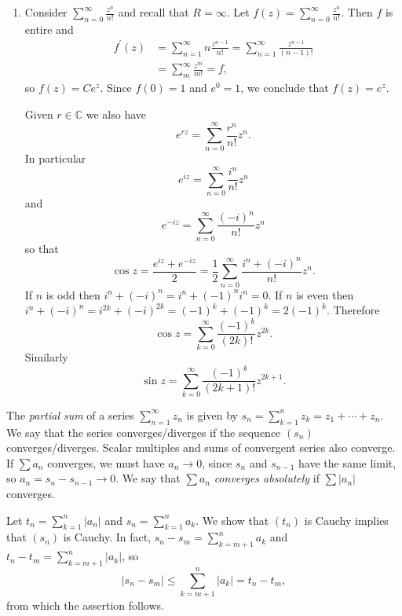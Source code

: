 \begin{xmpl}
  \begin{enumerate}
    \item{
      Consider $\sum_{n=0}^\infty \frac{z^n}{n!}$ and recall that $R = \infty$.
      Let $f(z) = \sum_{n=0}^\infty \frac{z^n}{n!}$. Then $f$ is entire and
      \begin{align*}
         f^\prime(z)
      &= \sum_{n=1}^\infty n \frac{z^{n-1}}{n!}
       = \sum_{n=1}^\infty \frac{z^{n-1}}{(n-1)!} \\
      &= \sum_{m}^\infty \frac{z^m}{m!} = f,
      \end{align*}
      so $f(z) = C e^z$. Since $f(0) = 1$ and $e^0 = 1$,
      we conclude that $f(z) = e^z$.

      Given $r \in \mathbb{C}$ we also have
      $$
      e^{rz} = \sum_{n=0}^\infty \frac{r^n}{n!}z^n.
      $$
      In particular
      $$
      e^{iz} = \sum_{n=0}^\infty \frac{i^n}{n!} z^n
      $$
      and
      $$
      e^{-iz} = \sum_{n=0}^\infty \frac{(-i)^n}{n!} z^n
      $$
      so that
      $$
        \cos z
      = \frac{e^{iz} + e^{-iz}}{2}
      = \frac{1}{2} \sum_{n=0}^\infty \frac{i^n + (-i)^n}{n!} z^n.
      $$
      If $n$ is odd then $i^n + (-i)^n = i^n + (-1)^n i^n = 0$.
      If $n$ is even then
      $i^n + (-i)^n = i^{2k} + (-i)^{2k} = (-1)^k + (-1)^k = 2(-1)^k$.
      Therefore
      $$
      \cos z = \sum_{k=0}^\infty \frac{(-1)^k}{(2k)!} z^{2k}.
      $$
      Similarly
      $$
      \sin z = \sum_{k=0}^\infty \frac{(-1)^k}{(2k+1)!} z^{2k+1}.
      $$
    }
  \end{enumerate}
\end{xmpl}

\begin{defn}
  The \emph{partial sum} of a series $\sum_{n=1}^\infty z_n$
  is given by
  $s_n = \sum_{k=1}^n z_k = z_1 + \cdots + z_n$.
  We say that the series converges/diverges if the sequence
  $(s_n)$ converges/diverges. Scalar multiples and sums of
  convergent series also converge. If $\sum a_n$ converges,
  we must have $a_n \to 0$, since $s_n$ and $s_{n-1}$ have
  the same limit, so $a_n = s_n - s_{n-1} \to 0$. We say
  that $\sum a_n$ \emph{converges absolutely} if
  $\sum |a_n|$ converges.
\end{defn}

Let $t_n = \sum_{k=1}^n |a_n|$ and $s_n = \sum_{k=1}^n a_k$.
We show that $(t_n)$ is Cauchy implies that $(s_n)$ is Cauchy.
In fact, $s_n - s_m = \sum_{k=m+1}^n a_k$ and
$t_n - t_m = \sum_{k=m+1}^n |a_k|$, so
$$
|s_n - s_m| \leq \sum_{k=m+1}^n |a_k| = t_n - t_m,
$$
from which the assertion follows.

